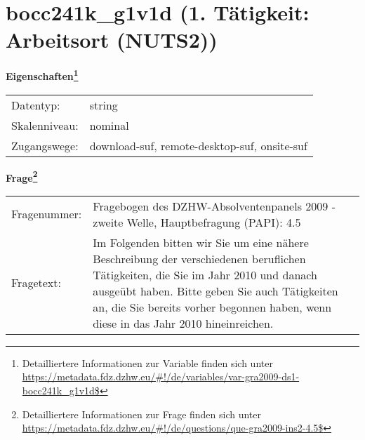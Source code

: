
    \setcounter{footnote}{0}

    \vspace*{-1.8cm}
	\section{bocc241k\_g1v1d (1. Tätigkeit: Arbeitsort (NUTS2))}
	\label{section:bocc241k_g1v1d}



    \vspace*{0.5cm}
    \noindent\textbf{Eigenschaften\footnote{Detailliertere Informationen zur Variable finden sich unter
		\url{https://metadata.fdz.dzhw.eu/\#!/de/variables/var-gra2009-ds1-bocc241k_g1v1d$}}}\\
	\begin{tabularx}{\hsize}{@{}lX}
	Datentyp: & string \\
	Skalenniveau: & nominal \\
	Zugangswege: &
	  download-suf, 
	  remote-desktop-suf, 
	  onsite-suf
 \\
    \end{tabularx}



				\vspace*{0.5cm}
                \noindent\textbf{Frage\footnote{Detailliertere Informationen zur Frage finden sich unter
		              \url{https://metadata.fdz.dzhw.eu/\#!/de/questions/que-gra2009-ins2-4.5$}}}\\
				\begin{tabularx}{\hsize}{@{}lX}
					Fragenummer: &
					  Fragebogen des DZHW-Absolventenpanels 2009 - zweite Welle, Hauptbefragung (PAPI):
					  4.5
 \\
					Fragetext: & Im Folgenden bitten wir Sie um eine nähere Beschreibung der verschiedenen beruflichen Tätigkeiten, die Sie im Jahr 2010 und danach ausgeübt haben. Bitte geben Sie auch Tätigkeiten an, die Sie bereits vorher begonnen haben, wenn diese in das Jahr 2010 hineinreichen. \\
				\end{tabularx}





